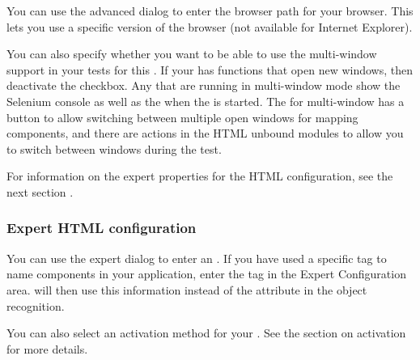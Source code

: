 You can use the advanced dialog to enter the browser path for your browser. This lets you use a specific version of the browser (not available for Internet Explorer). 

You can also specify whether you want to be able to use the multi-window support in your tests for this \gdaut{}. If your \gdaut{} has functions that open new windows, then deactivate the  checkbox. Any \gdauts{} that are running in multi-window mode show the Selenium console as well as the \gdaut{} when the \gdaut{} is started. The \gdomeditor{} for multi-window \gdauts{} has a button to allow switching between multiple open windows for mapping components, and there are  actions in the HTML unbound modules to allow you to switch between windows during the test. 

For information on the expert properties for the HTML \gdaut{} configuration, see the next section . 

\subsubsection{Expert HTML \gdaut{} configuration}
\label{ExpertAUTConfigHTML}

You can use the expert dialog to enter an  . If you have used a specific tag to name components in your application, enter the tag in the Expert Configuration area. \app{} will then use this information instead of the  attribute in the object recognition. 

You can also select an activation method for your \gdaut{}. See the section on \gdaut{} activation  for more details. 




